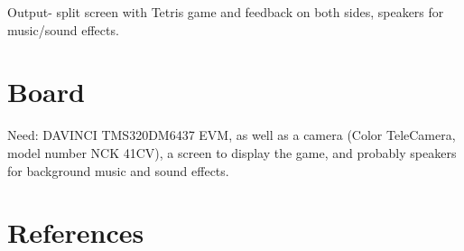 \documentclass{article}
\begin{document}
	Output- split screen with Tetris game and feedback on both sides, speakers for music/sound effects.\\
	\section{Board}
	Need: DAVINCI TMS320DM6437 EVM, as well as a camera (Color TeleCamera, model number NCK 41CV), a screen to display the game, and probably speakers for background music and sound effects.\\ 
	
	\section{References}
	
	
	
	
	
	
\end{document}
